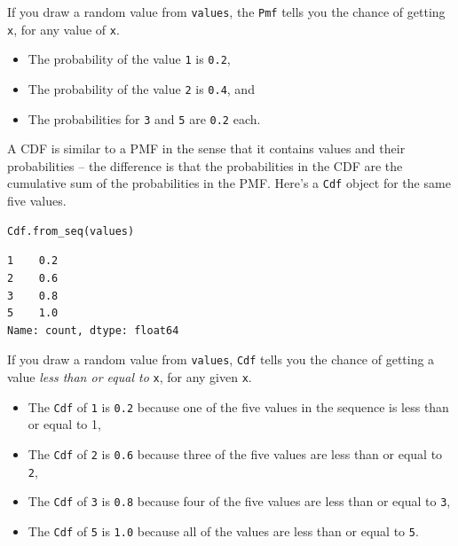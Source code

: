 If you draw a random value from \passthrough{\lstinline!values!}, the
\passthrough{\lstinline!Pmf!} tells you the chance of getting
\passthrough{\lstinline!x!}, for any value of
\passthrough{\lstinline!x!}.

\begin{itemize}
\item
  The probability of the value \passthrough{\lstinline!1!} is
  \passthrough{\lstinline!0.2!},
\item
  The probability of the value \passthrough{\lstinline!2!} is
  \passthrough{\lstinline!0.4!}, and
\item
  The probabilities for \passthrough{\lstinline!3!} and
  \passthrough{\lstinline!5!} are \passthrough{\lstinline!0.2!} each.
\end{itemize}

A CDF is similar to a PMF in the sense that it contains values and their
probabilities -- the difference is that the probabilities in the CDF are
the cumulative sum of the probabilities in the PMF. Here's a
\passthrough{\lstinline!Cdf!} object for the same five values.

\begin{lstlisting}[language=Python,style=source]
Cdf.from_seq(values)
\end{lstlisting}

\begin{lstlisting}[style=output]
1    0.2
2    0.6
3    0.8
5    1.0
Name: count, dtype: float64
\end{lstlisting}

If you draw a random value from \passthrough{\lstinline!values!},
\passthrough{\lstinline!Cdf!} tells you the chance of getting a value
\emph{less than or equal to} \passthrough{\lstinline!x!}, for any given
\passthrough{\lstinline!x!}.

\begin{itemize}
\item
  The \passthrough{\lstinline!Cdf!} of \passthrough{\lstinline!1!} is
  \passthrough{\lstinline!0.2!} because one of the five values in the
  sequence is less than or equal to 1,
\item
  The \passthrough{\lstinline!Cdf!} of \passthrough{\lstinline!2!} is
  \passthrough{\lstinline!0.6!} because three of the five values are
  less than or equal to \passthrough{\lstinline!2!},
\item
  The \passthrough{\lstinline!Cdf!} of \passthrough{\lstinline!3!} is
  \passthrough{\lstinline!0.8!} because four of the five values are less
  than or equal to \passthrough{\lstinline!3!},
\item
  The \passthrough{\lstinline!Cdf!} of \passthrough{\lstinline!5!} is
  \passthrough{\lstinline!1.0!} because all of the values are less than
  or equal to \passthrough{\lstinline!5!}.
\end{itemize}

